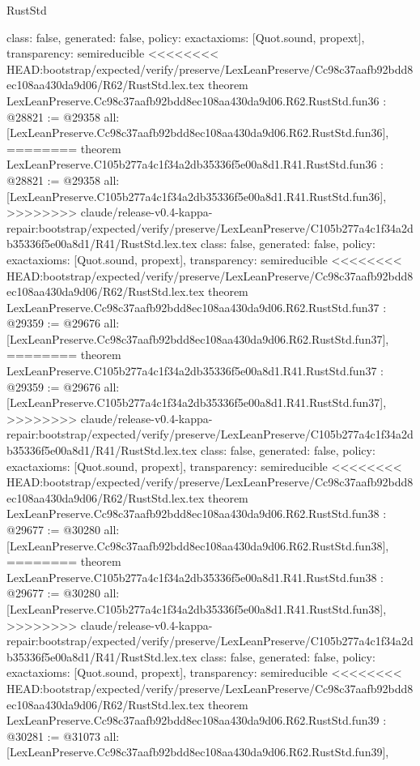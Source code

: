 \begin{lexlean}{RustStd}
\begin{coremodule}
{\begin{coremodule}
{{{{{{{{{{{{{{{{{{{{{{{{{{{{{{{{{{{{{{{  class: false,
  generated: false,
  policy: exact{axioms: [Quot.sound, propext]},
  transparency: semireducible
}
<<<<<<<< HEAD:bootstrap/expected/verify/preserve/LexLeanPreserve/Cc98c37aafb92bdd8ec108aa430da9d06/R62/RustStd.lex.tex
theorem LexLeanPreserve.Cc98c37aafb92bdd8ec108aa430da9d06.R62.RustStd.fun36 : @28821 := @29358 {
  all: [LexLeanPreserve.Cc98c37aafb92bdd8ec108aa430da9d06.R62.RustStd.fun36],
========
theorem LexLeanPreserve.C105b277a4c1f34a2db35336f5e00a8d1.R41.RustStd.fun36 : @28821 := @29358 {
  all: [LexLeanPreserve.C105b277a4c1f34a2db35336f5e00a8d1.R41.RustStd.fun36],
>>>>>>>> claude/release-v0.4-kappa-repair:bootstrap/expected/verify/preserve/LexLeanPreserve/C105b277a4c1f34a2db35336f5e00a8d1/R41/RustStd.lex.tex
  class: false,
  generated: false,
  policy: exact{axioms: [Quot.sound, propext]},
  transparency: semireducible
}
<<<<<<<< HEAD:bootstrap/expected/verify/preserve/LexLeanPreserve/Cc98c37aafb92bdd8ec108aa430da9d06/R62/RustStd.lex.tex
theorem LexLeanPreserve.Cc98c37aafb92bdd8ec108aa430da9d06.R62.RustStd.fun37 : @29359 := @29676 {
  all: [LexLeanPreserve.Cc98c37aafb92bdd8ec108aa430da9d06.R62.RustStd.fun37],
========
theorem LexLeanPreserve.C105b277a4c1f34a2db35336f5e00a8d1.R41.RustStd.fun37 : @29359 := @29676 {
  all: [LexLeanPreserve.C105b277a4c1f34a2db35336f5e00a8d1.R41.RustStd.fun37],
>>>>>>>> claude/release-v0.4-kappa-repair:bootstrap/expected/verify/preserve/LexLeanPreserve/C105b277a4c1f34a2db35336f5e00a8d1/R41/RustStd.lex.tex
  class: false,
  generated: false,
  policy: exact{axioms: [Quot.sound, propext]},
  transparency: semireducible
}
<<<<<<<< HEAD:bootstrap/expected/verify/preserve/LexLeanPreserve/Cc98c37aafb92bdd8ec108aa430da9d06/R62/RustStd.lex.tex
theorem LexLeanPreserve.Cc98c37aafb92bdd8ec108aa430da9d06.R62.RustStd.fun38 : @29677 := @30280 {
  all: [LexLeanPreserve.Cc98c37aafb92bdd8ec108aa430da9d06.R62.RustStd.fun38],
========
theorem LexLeanPreserve.C105b277a4c1f34a2db35336f5e00a8d1.R41.RustStd.fun38 : @29677 := @30280 {
  all: [LexLeanPreserve.C105b277a4c1f34a2db35336f5e00a8d1.R41.RustStd.fun38],
>>>>>>>> claude/release-v0.4-kappa-repair:bootstrap/expected/verify/preserve/LexLeanPreserve/C105b277a4c1f34a2db35336f5e00a8d1/R41/RustStd.lex.tex
  class: false,
  generated: false,
  policy: exact{axioms: [Quot.sound, propext]},
  transparency: semireducible
}
<<<<<<<< HEAD:bootstrap/expected/verify/preserve/LexLeanPreserve/Cc98c37aafb92bdd8ec108aa430da9d06/R62/RustStd.lex.tex
theorem LexLeanPreserve.Cc98c37aafb92bdd8ec108aa430da9d06.R62.RustStd.fun39 : @30281 := @31073 {
  all: [LexLeanPreserve.Cc98c37aafb92bdd8ec108aa430da9d06.R62.RustStd.fun39],
}}}}}}}}}}}}}}}}}}}}}}}}}}}}}}}}}}}}}}}}}}
\end{coremodule}}
\end{coremodule}
\end{lexlean}
